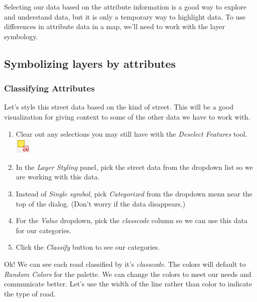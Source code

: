 \documentclass[
]{article}
\providecommand{\tightlist}{%
  \setlength{\itemsep}{0pt}\setlength{\parskip}{0pt}}
\begin{document}
Selecting our data based on the attribute information is a good way to explore and understand data, but it is only a temporary way to highlight data. To use differences in attribute data in a map, we'll need to work with the layer symbology.

\hypertarget{symbolizing-layers-by-attributes}{%
\subsection{Symbolizing layers by attributes}\label{symbolizing-layers-by-attributes}}

\hypertarget{classifying-attributes}{%
\subsubsection{Classifying Attributes}\label{classifying-attributes}}

Let's style this street data based on the kind of street. This will be a good visualization for giving context to some of the other data we have to work with.

\begin{enumerate}
\def\labelenumi{\arabic{enumi}.}
\tightlist
\item
  Clear out any selections you may still have with the \emph{Deselect Features} tool. \includegraphics{./images/Tool_Deselect.PNG}
\item
  In the \emph{Layer Styling} panel, pick the street data from the dropdown list so we are working with this data.\\
\item
  Instead of \emph{Single symbol}, pick \emph{Categorized} from the dropdown menu near the top of the dialog. (Don't worry if the data disappears.)
\item
  For the \emph{Value} dropdown, pick the \emph{classcode} column so we can use this data for our categories.
\item
  Click the \emph{Classify} button to see our categories.
\end{enumerate}

Ok! We can see each road classified by it's \emph{classcode}. The colors will default to \emph{Random Colors} for the palette. We can change the colors to meet our needs and communicate better. Let's use the width of the line rather than color to indicate the type of road.
\end{document}
